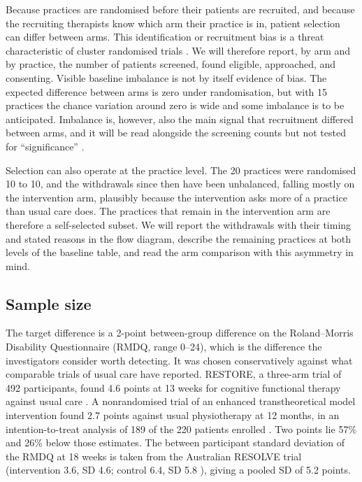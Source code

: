 \documentclass[11pt,a4paper]{article}
\begin{document}
Because practices are randomised before their patients are recruited, and
because the recruiting therapists know which arm their practice is in, patient
selection can differ between arms. This identification or recruitment bias is
a threat characteristic of cluster randomised trials
\citep{campbell2012, eldridge2009}. We will therefore report, by arm and by
practice, the number of patients screened, found eligible, approached, and
consenting. Visible baseline imbalance is not by itself evidence of bias. The
expected difference between arms is zero under randomisation, but with 15
practices the chance variation around zero is wide and some imbalance is to be
anticipated. Imbalance is, however, also the main signal that recruitment
differed between arms, and it will be read alongside the screening counts but
not tested for ``significance'' \citep{campbell2012, senn1994}.

Selection can also operate at the practice level. The 20 practices were
randomised 10 to 10, and the withdrawals since then have been unbalanced,
falling mostly on the intervention arm, plausibly
because the intervention asks more of a practice than usual care does. The
practices that remain in the intervention arm are therefore a self-selected
subset. We will report the withdrawals with their timing and stated reasons
in the flow diagram, describe the remaining practices at both levels of the
baseline table, and read the arm comparison with this asymmetry in mind.
\subsection{Sample size}
\label{sec:samplesize}

The target difference is a 2-point between-group difference on the
Roland--Morris Disability Questionnaire (RMDQ, range 0--24), which is the
difference the investigators consider worth detecting. It was chosen
conservatively against what comparable trials of usual care have reported.
RESTORE, a three-arm trial of 492 participants, found 4.6 points at 13 weeks
for cognitive functional therapy against usual care \citep{kent2023}. A
nonrandomised trial of an enhanced transtheoretical model intervention found
2.7 points against usual physiotherapy at 12 months, in an intention-to-treat
analysis of 189 of the 220 patients enrolled \citep{benami2017}. Two points lie
57\% and 26\% below those estimates.
The between
participant standard deviation of the RMDQ at 18 weeks is taken from the
Australian RESOLVE trial (intervention 3.6, SD 4.6; control 6.4, SD 5.8
\citep{bagg2022}), giving a pooled SD of 5.2 points. 
\end{document}
